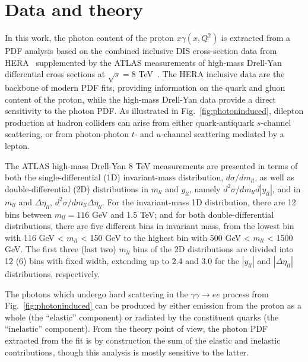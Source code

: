\section{Data and theory}
\label{sec:theory}

In this work, the photon content of the proton $x\gamma(x,Q^2)$ is
extracted from a PDF analysis based on the combined inclusive DIS
cross-section data from HERA~\cite{Abramowicz:2015mha}
supplemented by the ATLAS measurements of high-mass Drell-Yan
differential cross sections at $\sqrt{s}=8$ TeV~\cite{Aad:2016zzw}.
%
The HERA inclusive data are the backbone of modern PDF fits, providing
information on the quark and gluon content of the proton, while
the high-mass Drell-Yan data provide a direct sensitivity to the
photon PDF.
%
As illustrated in Fig.~\ref{fig:photoninduced}, 
 dilepton production at hadron colliders can arise
from either quark-antiquark $s$-channel scattering, or from
photon-photon $t$- and $u$-channel scattering mediated by a lepton.

The ATLAS high-mass Drell-Yan 8 TeV measurements are presented in terms
of both the
single-differential (1D) invariant-mass distribution,
$d\sigma/dm_{ll}$, as well as double-differential (2D)
distributions in $m_{ll}$ and $y_{ll}$, namely
$d^{2}\sigma/dm_{ll}d|y_{ll}|$, and in $m_{ll}$ and $\Delta\eta_{ll}$,
$d^{2}\sigma/dm_{ll}\Delta\eta_{ll}$.
%
For the invariant-mass 1D distribution, there are 12 bins between $m_{ll}=116$ GeV
and 1.5 TeV; and for both double-differential distributions,
there are five different bins in invariant mass,
from the lowest bin with 116 GeV < $m_{ll}$ <
150 GeV to the highest bin with 500 GeV < $m_{ll}$ < 1500 GeV.
The first three (last two) $m_{ll}$ bins of the 2D distributions are divided into 12 (6) bins
with fixed width, extending up to 2.4 and 3.0 for the $|y_{ll}|$
and $|\Delta\eta_{ll}|$ distributions, respectively.
%

The photons which undergo hard scattering in the
$\gamma\gamma \to ee$  process from Fig.~\ref{fig:photoninduced}
can be produced by either  emission from the
proton as a whole (the ``elastic'' component) or radiated by the constituent quarks
(the ``inelastic'' component).
%
 From the theory point of view, the photon PDF extracted from the
 fit is by construction the sum of the elastic and inelastic contributions,
 though this analysis is mostly sensitive to the latter.

